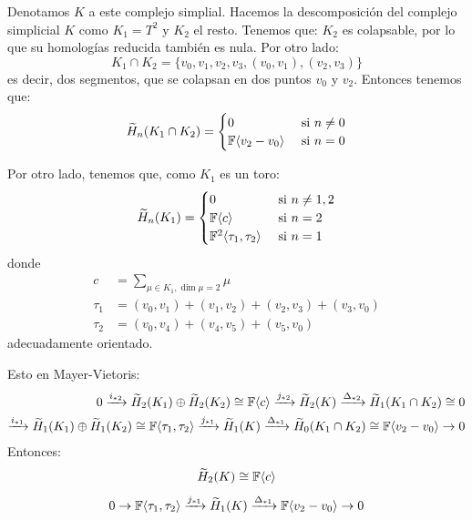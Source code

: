 \documentclass[twoside]{article}
\begin{document}
\begin{solucion}
Denotamos $K$ a este complejo simplial. Hacemos la descomposición del complejo simplicial $K$ como $K_1=T^2$ y $K_2$ el resto. Tenemos que:
$K_2$ es colapsable, por lo que su homologías reducida también es nula.
Por otro lado:
\[ K_1 \cap K_2 = \{ v_0, v_1, v_2, v_3, (v_0, v_1), (v_2, v_3) \} \]
es decir, dos segmentos, que se colapsan en dos puntos $v_0$ y $v_2$.
Entonces tenemos que:
\[
\widetilde{H}_n(K_1 \cap K_2) =
\begin{cases}
	0 & \text{ si }n \neq 0\\
	\mathbb{F}\langle{v_2-v_0}\rangle & \text{ si }n = 0
\end{cases}
\]

Por otro lado, tenemos que, como $K_1$ es un toro:
\[
\widetilde{H}_n(K_1) =
\begin{cases}
	0 & \text{ si }n \neq 1,2\\
	\mathbb{F}\langle{c}\rangle & \text{ si }n = 2\\
	\mathbb{F}^2\langle{\tau_1, \tau_2}\rangle & \text{ si }n = 1
\end{cases}
\]
donde
\begin{align*}
c & = \sum_{\mu \in K_1, \dim\mu = 2} \mu\\
\tau_1 & = (v_0, v_1) + (v_1, v_2) + (v_2, v_3) + (v_3, v_0)\\
\tau_2 & = (v_0, v_4) + (v_4, v_5) + (v_5, v_0)
\end{align*}
adecuadamente orientado.

Esto en Mayer-Vietoris:
\begin{align*}
0 \xrightarrow{i_{*2}} \widetilde{H}_2(K_1)\oplus \widetilde{H}_2(K_2) \cong \mathbb{F}\langle{c}\rangle \xrightarrow{j_{*2}} \widetilde{H}_2(K) \xrightarrow{\Delta_{*2}} \widetilde{H}_1(K_1 \cap K_2) \cong 0\\
\xrightarrow{i_{*1}} \widetilde{H}_1(K_1)\oplus \widetilde{H}_1(K_2) \cong \mathbb{F}\langle{\tau_1,\tau_2}\rangle\xrightarrow{j_{*1}} \widetilde{H}_1(K) \xrightarrow{\Delta_{*1}} \widetilde{H}_0(K_1 \cap K_2) \cong \mathbb{F}\langle{v_2-v_0}\rangle \to 0
\end{align*}
Entonces:
\[ \widetilde{H}_2(K) \cong \mathbb{F}\langle{c}\rangle \]
\[ 0 \to \mathbb{F}\langle{\tau_1,\tau_2}\rangle\xrightarrow{j_{*1}} \widetilde{H}_1(K) \xrightarrow{\Delta_{*1}} \mathbb{F}\langle{v_2-v_0}\rangle \to 0\]
\end{solucion}

\newpage
\end{document}
